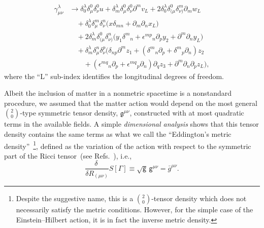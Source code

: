 \documentclass[aps,prd,12pt,twocolumn,superscriptaddress,showpacs,showkeys,reprint,longbibliography]{revtex4-1}
\renewcommand{\(}{\left(}
\renewcommand{\)}{\right)}
\renewcommand{\[}{\left[}
\renewcommand{\]}{\right]}
\newcommand{\hl}[1]{{\color{red} \bfseries{#1}}}
\begin{document}
\begin{equation}
  \begin{split}
    \gamma^\lambda_{\mu\nu}
    &\to
    \delta^\lambda_0\delta^0_\mu\delta^0_\nu u 
    + \delta^\lambda_m \delta^0_\mu\delta^0_\nu \partial^m v_L
    + 2\delta^\lambda_0 \delta^0_{(\mu}\delta^m_{\nu)} \partial_m w_L
    \\
    & \quad + \delta^\lambda_0 \delta^m_\mu\delta^n_\nu \Big(x \delta_{mn} + \partial_m \partial_n x_L\Big)
    \\
    & \quad + 2\delta^\lambda_m \delta^0_{(\mu}\delta^n_{\nu)} \Big(y_1 \delta^m{}_n + \epsilon^{m p}{}_{n} \partial_p y_2 + \partial^m \partial_n y_L\Big)
    \\
    & \quad + \delta^\lambda_m \delta^n_{\mu}\delta^p_{\nu} \Big(\delta_{n p} \partial^m z_1 + (\delta^m{}_n \partial_p+\delta^m{}_p \partial_n) z_2
    \\
    & \qquad +  (\epsilon^{m q}{}_n \partial_p+\epsilon^{m q}{}_p \partial_n) \partial_q z_3 + \partial^m \partial_n \partial_p z_L\Big),
  \end{split}
\end{equation}
where the ``L'' sub-index identifies the longitudinal degrees of freedom.


Albeit the inclusion of matter in a nonmetric spacetime is a nonstandard procedure, we assumed that the matter action would depend on the most general $\binom{2}{0}$-type symmetric tensor density, $\mathfrak{g}^{\mu \nu}$, constructed with at most quadratic terms in the available fields. A simple \emph{dimensional analysis} shows that this tensor density contains the same terms as what we call the ``Eddington's metric density''~\footnote{Despite the suggestive name, this is a $\binom{2}{0}$-tensor density which does not necessarily satisfy the metric conditions. However, for the simple case of the Einstein--Hilbert action, it is in fact the inverse metric density.}, defined as the variation of the action with respect to the symmetric part of the Ricci tensor~(see Refs.~\cite{Eddington1923math,schrodinger1950space,Poplawski:2012bw}), i.e.,%
\begin{equation}
  \label{metric}
  \frac{\delta\ }{\delta R_{(\mu\nu)}} S[\Gamma] \equiv \sqrt{\mathsf{g}} \, \mathsf{g}^{\mu\nu} = \bar{g}^{\mu\nu}.
\end{equation}
\end{document}

